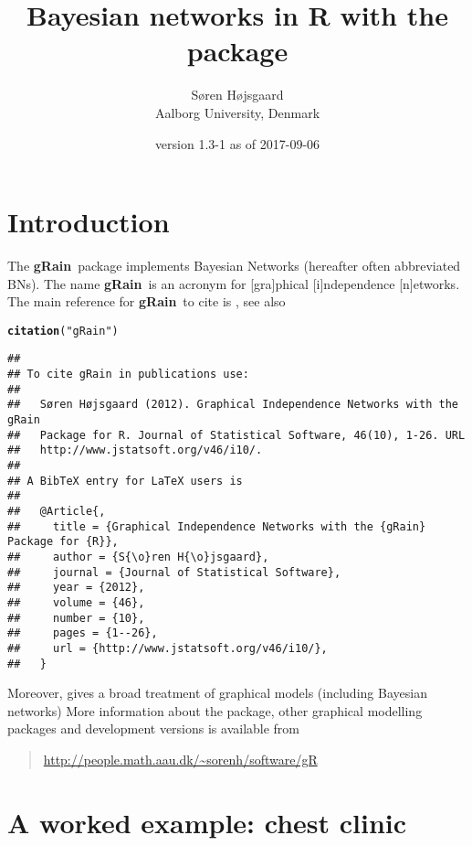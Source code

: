 \documentclass[10pt]{article}\usepackage[]{graphicx}\usepackage[]{color}
\author{S{\o}ren H{\o}jsgaard\\Aalborg University, Denmark}
\title{Bayesian networks in R with the \pkg{gRain} package}
\date{\pkg{gRain} version 1.3-1 as of 2017-09-06}
\makeatletter
\newcommand{\hlstr}[1]{\textcolor[rgb]{0.192,0.494,0.8}{#1}}%
\newcommand{\hlstd}[1]{\textcolor[rgb]{0.345,0.345,0.345}{#1}}%
\newcommand{\hlkwd}[1]{\textcolor[rgb]{0.737,0.353,0.396}{\textbf{#1}}}%
\newenvironment{kframe}{%
 \def\at@end@of@kframe{}%
 \ifinner\ifhmode%
  \def\at@end@of@kframe{\end{minipage}}%
  \begin{minipage}{\columnwidth}%
 \fi\fi%
 \def\FrameCommand##1{\hskip\@totalleftmargin \hskip-\fboxsep
 \colorbox{shadecolor}{##1}\hskip-\fboxsep
     \hskip-\linewidth \hskip-\@totalleftmargin \hskip\columnwidth}%
 \MakeFramed {\advance\hsize-\width
   \@totalleftmargin\z@ \linewidth\hsize
   \@setminipage}}%
 {\par\unskip\endMakeFramed%
 \at@end@of@kframe}
\newenvironment{knitrout}{}{} %
\def\grbn{{\bf gRain}}
\makeatother
\begin{document}
\maketitle
\tableofcontents
\parindent0pt\parskip5pt

\section{Introduction}

The \grbn\ package implements Bayesian Networks (hereafter often
abbreviated BNs). The name \grbn\ is an acronym for [gra]phical
[i]ndependence [n]etworks. The main reference for \grbn\ to cite is
\cite{hoj:12}, see also

\begin{knitrout}
\color{fgcolor}\begin{kframe}
\begin{alltt}
\hlkwd{citation}\hlstd{(}\hlstr{"gRain"}\hlstd{)}
\end{alltt}
\begin{verbatim}
## 
## To cite gRain in publications use:
## 
##   Søren Højsgaard (2012). Graphical Independence Networks with the gRain
##   Package for R. Journal of Statistical Software, 46(10), 1-26. URL
##   http://www.jstatsoft.org/v46/i10/.
## 
## A BibTeX entry for LaTeX users is
## 
##   @Article{,
##     title = {Graphical Independence Networks with the {gRain} Package for {R}},
##     author = {S{\o}ren H{\o}jsgaard},
##     journal = {Journal of Statistical Software},
##     year = {2012},
##     volume = {46},
##     number = {10},
##     pages = {1--26},
##     url = {http://www.jstatsoft.org/v46/i10/},
##   }
\end{verbatim}
\end{kframe}
\end{knitrout}

Moreover, \cite{hoj:edw:lau:12} gives a broad treatment of graphical models (including Bayesian networks)
More information about the package, other graphical modelling packages
and development versions is available from
\begin{quote}
\url{http://people.math.aau.dk/~sorenh/software/gR}
\end{quote}


\section{A worked example: chest clinic}
\label{sec:chest}
\end{document}
